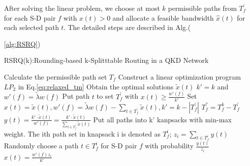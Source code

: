 After solving the linear problem, we choose at most $k$ permissible paths from $T^{'}_{f}$ for each S-D pair $f$ with $x(t) > 0$ and allocate a feasible bandwidth $\hat{x}(t)$ for each selected path $t$. The detailed steps are described in Alg.({\ref{alg:RSRQ})

\begin{algorithm}[h]\label{RSRQ}
	\caption{RSRQ(k):Rounding-based k-Splitttable Routing in a QKD Network}
	\begin{algorithmic}[1]
		\STATE Calculate the permissible path set $T_f$
		\ENDFOR
		\STATE  Construct a linear optimization program $LP_2$ in Eq.\ref{eq:relaxed_tm}
		\STATE Obtain the optimal solutions $\widetilde{x}(t)$
		\STATE $k' = k$ and $w'(f) = \widetilde{\lambda}w(f)$
		\STATE Put path $t$ to set $T^{'}_f$ with $x(t) \ge \frac{w'(f)}{k'}$
		\STATE Set $\hat{x}(t) = \widetilde{x}(t), w'(f) = \widetilde{\lambda}w(f) - \sum_{t \in T^{'}_f} \widetilde{x}(t), k' = k - |T^{'}_f|$
		\ENDWHILE
		\STATE $T^{''}_{f} = T^k_f - T^{'}_f$
		\STATE $y(t) = \frac{k' \cdot \widetilde{x}(t)}{w'(f)} = \frac{k' \cdot \widetilde{x}(t)}{\sum_{t \in T^{''}_f} \widetilde{x}(t)}$
		\ENDFOR
		\STATE Put all paths into k' kanpsacks with min-max weight. The ith path set in knapsack i is denoted as $T^i_f$;
		\STATE $z_i = \sum_{t \in T^i_f}y(t)$
		\STATE Randomly choose a path $t \in T^i_f$ for S-D pair $f$ with probability $\frac{y(t)}{z_i}$
		\STATE $\hat{x}(t) = \frac{w'(f)z_i}{k'}$
		\ENDFOR
		\ENDFOR
	\end{algorithmic}
\end{algorithm}


}
